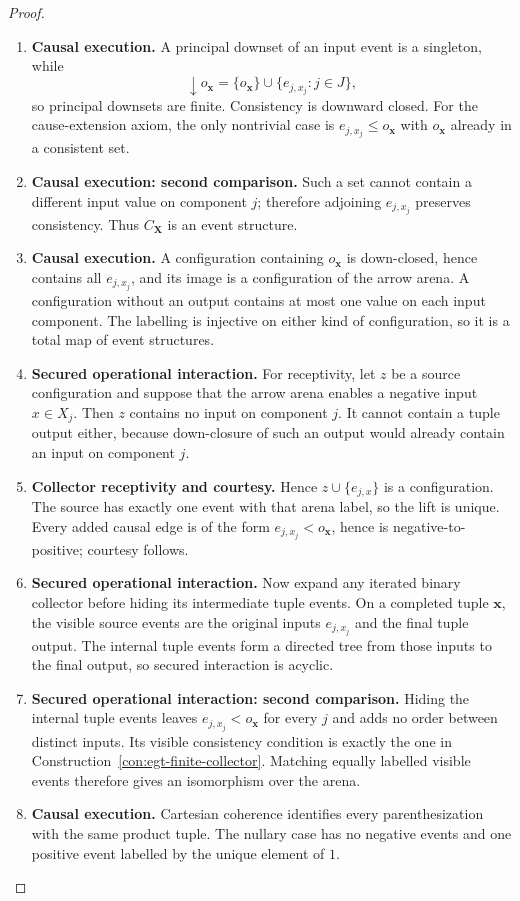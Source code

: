 \documentclass[11pt,a4paper]{article}
\numberwithin{equation}{section}
\theoremstyle{definition}
\theoremstyle{remark}
\theoremstyle{plain}
\begin{document}
\begin{proof}
\leavevmode
\begin{enumerate}[label=\textup{(\arabic*)},leftmargin=*,itemsep=4pt,topsep=3pt]
  \item \textbf{Causal execution.} A principal downset of an input event is a singleton, while
\[
 \downarrow o_{\mathbf x}
 =\{o_{\mathbf x}\}\cup\{e_{j,x_j}:j\in J\},
\]
so principal downsets are finite. Consistency is downward closed. For the
cause-extension axiom, the only nontrivial case is
$e_{j,x_j}\leq o_{\mathbf x}$ with $o_{\mathbf x}$ already in a consistent
set.
  \item \textbf{Causal execution: second comparison.} Such a set cannot contain a different input value on component $j$;
therefore adjoining $e_{j,x_j}$ preserves consistency. Thus
$C_{\mathbf X}$ is an event structure.
  \item \textbf{Causal execution.} A configuration containing $o_{\mathbf x}$ is down-closed, hence contains all
$e_{j,x_j}$, and its image is a configuration of the arrow arena. A
configuration without an output contains at most one value on each input
component. The labelling is injective on either kind of configuration, so it
is a total map of event structures.
  \item \textbf{Secured operational interaction.} For receptivity, let $z$ be a source configuration and suppose that the arrow
arena enables a negative input $x\in X_j$. Then $z$ contains no input on
component $j$. It cannot contain a tuple output either, because down-closure of
such an output would already contain an input on component $j$.
  \item \textbf{Collector receptivity and courtesy.} Hence
$z\cup\{e_{j,x}\}$ is a configuration. The source has exactly one event with
that arena label, so the lift is unique. Every added causal edge is of the form
$e_{j,x_j}<o_{\mathbf x}$, hence is negative-to-positive; courtesy follows.
  \item \textbf{Secured operational interaction.} Now expand any iterated binary collector before hiding its intermediate tuple
events. On a completed tuple $\mathbf x$, the visible source events are the
original inputs $e_{j,x_j}$ and the final tuple output. The internal tuple
events form a directed tree from those inputs to the final output, so secured
interaction is acyclic.
  \item \textbf{Secured operational interaction: second comparison.} Hiding the internal tuple events leaves
$e_{j,x_j}<o_{\mathbf x}$ for every $j$ and adds no order between distinct
inputs. Its visible consistency condition is exactly the one in
Construction~\ref{con:egt-finite-collector}. Matching equally labelled
visible events therefore gives an isomorphism over the arena.
  \item \textbf{Causal execution.} Cartesian
coherence identifies every parenthesization with the same product tuple. The
nullary case has no negative events and one positive event labelled by the
unique element of $1$.
\end{enumerate}
\end{proof}
\end{document}
